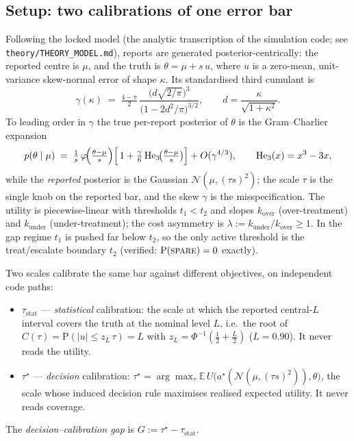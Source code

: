 \subsection{Setup: two calibrations of one error bar}
\label{sec:setup}

Following the locked model (the analytic transcription of the simulation code; see
\texttt{theory/\allowbreak THEORY\_MODEL.md}), reports are generated posterior-centrically: the reported centre is
$\mu$, and the truth is $\theta = \mu + s\,u$, where $u$ is a zero-mean, unit-variance skew-normal
error of shape $\kappa$. Its standardised third cumulant is
\begin{equation}
\gamma(\kappa) \;=\; \tfrac{4-\pi}{2}\,\frac{\bigl(d\sqrt{2/\pi}\bigr)^3}{\bigl(1-2d^2/\pi\bigr)^{3/2}},
\qquad d=\frac{\kappa}{\sqrt{1+\kappa^2}} .
\label{eq:gammakappa}
\end{equation}
To leading order in $\gamma$ the true per-report posterior of $\theta$ is the Gram--Charlier
expansion
\begin{equation}
p(\theta\mid\mu) \;=\; \tfrac{1}{s}\,\varphi\!\Bigl(\tfrac{\theta-\mu}{s}\Bigr)
\Bigl[\,1+\tfrac{\gamma}{6}\,\mathrm{He}_3\!\bigl(\tfrac{\theta-\mu}{s}\bigr)\Bigr]
+O(\gamma^{4/3}),
\qquad \mathrm{He}_3(x)=x^3-3x,
\label{eq:gramcharlier}
\end{equation}
while the \emph{reported} posterior is the Gaussian $\mathcal{N}(\mu,(\tau s)^2)$; the scale $\tau$ is
the single knob on the reported bar, and the skew $\gamma$ is the misspecification. The utility is
piecewise-linear with thresholds $t_1<t_2$ and slopes $k_{\mathrm{over}}$ (over-treatment) and
$k_{\mathrm{under}}$ (under-treatment); the cost asymmetry is $\lambda := k_{\mathrm{under}}/k_{\mathrm{over}}\ge 1$.
In the gap regime $t_1$ is pushed far below $t_2$, so the only active threshold is the treat/escalate
boundary $t_2$ (verified: $\mathrm{P}(\textsc{spare})=0$ exactly).

Two scales calibrate the same bar against different objectives, on independent code paths:
\begin{itemize}
  \item $\tau_{\mathrm{stat}}$ --- \emph{statistical} calibration: the scale at which the reported
  central-$L$ interval covers the truth at the nominal level $L$, i.e.\ the root of
  $C(\tau)=\mathrm{P}(|u|\le z_L\,\tau)=L$ with $z_L=\Phi^{-1}(\tfrac12+\tfrac{L}{2})$ ($L=0.90$).
  It never reads the utility.
  \item $\tau^\star$ --- \emph{decision} calibration: $\tau^\star=\arg\max_\tau \mathbb{E}\,
  U\!\bigl(a^\star(\mathcal{N}(\mu,(\tau s)^2)),\theta\bigr)$, the scale whose induced decision rule
  maximises realised expected utility. It never reads coverage.
\end{itemize}
The \emph{decision--calibration gap} is $G := \tau^\star - \tau_{\mathrm{stat}}$.

